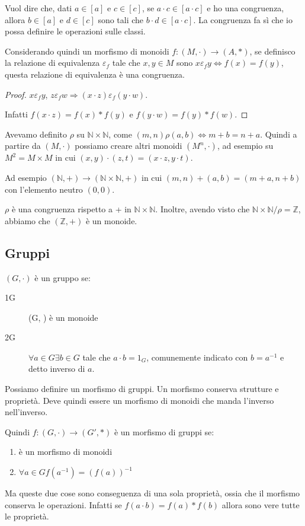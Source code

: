 Vuol dire che, dati $a \in [a]$ e $c \in [c]$, se $a \cdot c \in [a \cdot c]$ e ho una congruenza, allora $b \in [a]$ e $d \in [c]$ sono tali che $b \cdot d \in [a \cdot c]$. La congruenza fa s\`i che io possa definire le operazioni sulle classi.

Considerando quindi un morfismo di monoidi $f : (M, \cdot) \to (A, \ast)$, se definisco la relazione di equivalenza $\varepsilon_f$ tale che $x, y \in M$ sono $x \varepsilon_f y \Leftrightarrow f(x) = f(y)$, questa relazione di equivalenza \`e una congruenza.
\begin{proof}
$x \varepsilon_f y$, $z \varepsilon_f w \Rightarrow (x \cdot z) \varepsilon_f (y \cdot w)$.

Infatti $f(x \cdot z) = f(x) \ast f(y)$ e $f(y \cdot w) = f(y) \ast f(w)$. 
\end{proof}

Avevamo definito $\rho$ su $\mathbb{N} \times \mathbb{N}$, come $(m, n) \rho (a, b) \Leftrightarrow m+b = n+a$. Quindi a partire da $(M, \cdot) $ possiamo creare altri monoidi $(M^n, \cdot)$, ad esempio su $M^2 = M \times M$ in cui $(x, y) \cdot (z, t) = (x \cdot z, y \cdot t)$.

Ad esempio $(\mathbb{N}, +) \to (\mathbb{N} \times \mathbb{N}, +)$ in cui $(m, n) + (a, b) = (m+a, n+b)$ con l'elemento neutro $(0,0)$.

$\rho$ \`e una congruenza rispetto a + in $\mathbb{N} \times \mathbb{N}$. Inoltre, avendo visto che $\mathbb{N} \times \mathbb{N} / \rho = \mathbb{Z}$, abbiamo che $(\mathbb{Z}, +)$ \`e un monoide.

\subsection{Gruppi}

$(G, \cdot)$ \`e un gruppo se:
\begin{description}
    \item[1G] (G, \cdot) \`e un monoide
    \item[2G] $\forall a \in G \exists b \in G $ tale che $a \cdot b = 1_G$, comunemente indicato con $b = a^{-1}$ e detto inverso di $a$.
\end{description}

Possiamo definire un morfismo di gruppi. Un morfismo conserva strutture e propriet\`a. Deve quindi essere un morfismo di monoidi che manda l'inverso nell'inverso.

Quindi $f : (G, \cdot) \to (G', \ast)$ \`e un morfismo di gruppi se:
\begin{enumerate}
    \item \`e un morfismo di monoidi
    \item $\forall a \in G f(a^{-1}) = (f(a))^{-1}$
\end{enumerate}
Ma queste due cose sono conseguenza di una sola propriet\`a, ossia che il morfismo conserva le operazioni. Infatti se $f(a \cdot b) = f(a) \ast f(b)$ allora sono vere tutte le propriet\`a.

